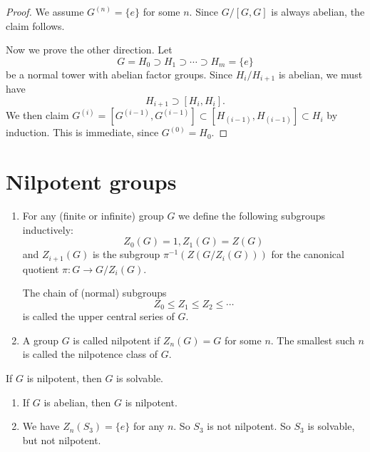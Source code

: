 \begin{proof}
    We assume $G^{(n)} = \{e\}$ for some $n$. Since $G/ [G,G]$ is always abelian, the claim follows.

    Now we prove the other direction. Let
    \[
        G = H_0 \supset H_1 \supset \cdots \supset H_m = \{e\}
    \]
    be a normal tower with abelian factor groups. Since $H_i/ H_{i+1}$ is abelian, we must have
    \[
        H_{i+1} \supset [H_i, H_i].
    \]
    We then claim $G^{(i)} = [G^{(i-1)}, G^{(i-1)}] \subset [H_{(i-1)}, H_{(i-1)}] \subset H_{i}$ by induction. This is immediate, since $G^{(0)} = H_0$.
\end{proof}




\section{Nilpotent groups}

\begin{defi}
    \begin{enumerate}
        \item For any (finite or infinite) group $G$ we define the following subgroups inductively:
              \[
                  Z_0 (G) =1, Z_1 (G) = Z(G)
              \]
              and $Z_{i+1}(G)$ is the subgroup $\pi^{-1} (Z (G/ Z_i(G)))$ for the canonical quotient $\pi: G \rightarrow G/Z_i(G)$.

              The chain of (normal) subgroups
              \[
                  Z_0 \le Z_1 \le Z_2 \le \cdots
              \]
              is called the upper central series of $G$.
        \item A group $G$ is called nilpotent if $Z_n(G) =G$ for some $n$. The smallest such $n$ is called the nilpotence class of $G$.
    \end{enumerate}
\end{defi}

\begin{cor}If $G$ is nilpotent, then $G$ is solvable.
\end{cor}

\begin{example}
    \begin{enumerate}
        \item If $G$ is abelian, then $G$ is nilpotent.
        \item We have $Z_n (S_3) = \{e\}$ for any $n$. So $S_3$ is not nilpotent. So $S_3$ is solvable, but not nilpotent.
    \end{enumerate}
\end{example}


